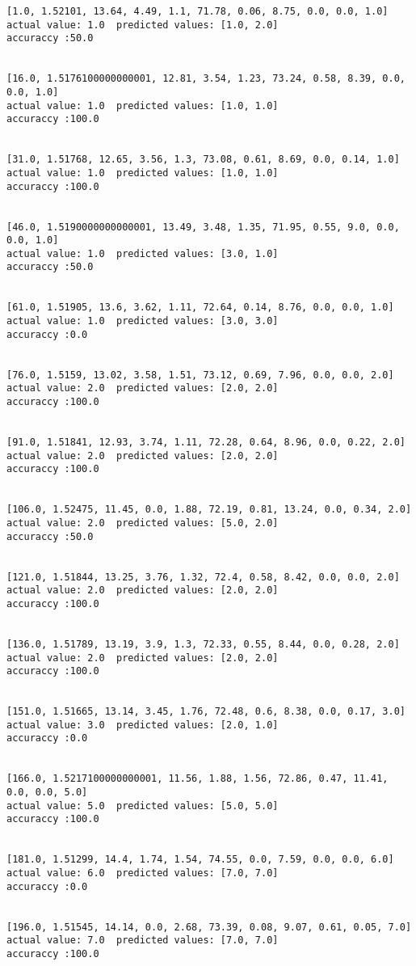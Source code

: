 \documentclass[11pt]{article}
\begin{document}
    \begin{Verbatim}[commandchars=\\\{\}]
[1.0, 1.52101, 13.64, 4.49, 1.1, 71.78, 0.06, 8.75, 0.0, 0.0, 1.0]
actual value: 1.0  predicted values: [1.0, 2.0]
accuraccy :50.0


[16.0, 1.5176100000000001, 12.81, 3.54, 1.23, 73.24, 0.58, 8.39, 0.0, 0.0, 1.0]
actual value: 1.0  predicted values: [1.0, 1.0]
accuraccy :100.0


[31.0, 1.51768, 12.65, 3.56, 1.3, 73.08, 0.61, 8.69, 0.0, 0.14, 1.0]
actual value: 1.0  predicted values: [1.0, 1.0]
accuraccy :100.0


[46.0, 1.5190000000000001, 13.49, 3.48, 1.35, 71.95, 0.55, 9.0, 0.0, 0.0, 1.0]
actual value: 1.0  predicted values: [3.0, 1.0]
accuraccy :50.0


[61.0, 1.51905, 13.6, 3.62, 1.11, 72.64, 0.14, 8.76, 0.0, 0.0, 1.0]
actual value: 1.0  predicted values: [3.0, 3.0]
accuraccy :0.0


[76.0, 1.5159, 13.02, 3.58, 1.51, 73.12, 0.69, 7.96, 0.0, 0.0, 2.0]
actual value: 2.0  predicted values: [2.0, 2.0]
accuraccy :100.0


[91.0, 1.51841, 12.93, 3.74, 1.11, 72.28, 0.64, 8.96, 0.0, 0.22, 2.0]
actual value: 2.0  predicted values: [2.0, 2.0]
accuraccy :100.0


[106.0, 1.52475, 11.45, 0.0, 1.88, 72.19, 0.81, 13.24, 0.0, 0.34, 2.0]
actual value: 2.0  predicted values: [5.0, 2.0]
accuraccy :50.0


[121.0, 1.51844, 13.25, 3.76, 1.32, 72.4, 0.58, 8.42, 0.0, 0.0, 2.0]
actual value: 2.0  predicted values: [2.0, 2.0]
accuraccy :100.0


[136.0, 1.51789, 13.19, 3.9, 1.3, 72.33, 0.55, 8.44, 0.0, 0.28, 2.0]
actual value: 2.0  predicted values: [2.0, 2.0]
accuraccy :100.0


[151.0, 1.51665, 13.14, 3.45, 1.76, 72.48, 0.6, 8.38, 0.0, 0.17, 3.0]
actual value: 3.0  predicted values: [2.0, 1.0]
accuraccy :0.0


[166.0, 1.5217100000000001, 11.56, 1.88, 1.56, 72.86, 0.47, 11.41, 0.0, 0.0, 5.0]
actual value: 5.0  predicted values: [5.0, 5.0]
accuraccy :100.0


[181.0, 1.51299, 14.4, 1.74, 1.54, 74.55, 0.0, 7.59, 0.0, 0.0, 6.0]
actual value: 6.0  predicted values: [7.0, 7.0]
accuraccy :0.0


[196.0, 1.51545, 14.14, 0.0, 2.68, 73.39, 0.08, 9.07, 0.61, 0.05, 7.0]
actual value: 7.0  predicted values: [7.0, 7.0]
accuraccy :100.0



\end{Verbatim}
\end{document}
